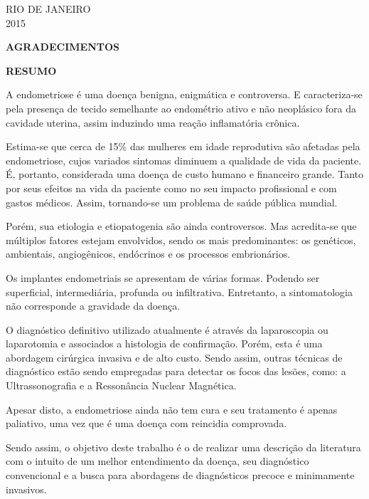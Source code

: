 \documentclass[12pt]{article} %
\begin{document}
\begin{center}
\MakeUppercase{Rio de Janeiro}\\
2015
\end{center}

\newpage

\begin{center}
\MakeUppercase{\textbf{Agradecimentos}}
\end{center}

\newpage
\begin{center}
\MakeUppercase{\textbf{Resumo}}
\end{center}

A endometriose é uma doença benigna, enigmática e controversa. E
caracteriza-se pela presença de tecido semelhante ao endométrio ativo
e não neoplásico fora da cavidade uterina, assim induzindo uma reação
inflamatória crônica.

Estima-se que cerca de 15\% das mulheres em idade reprodutiva são
afetadas pela endometriose, cujos variados sintomas diminuem a
qualidade de vida da paciente. É, portanto, considerada uma doença de
custo humano e financeiro grande.  Tanto por seus efeitos na vida da
paciente como no seu impacto profissional e com gastos médicos.
Assim, tornando-se um problema de saúde pública mundial.

Porém, sua etiologia e etiopatogenia são ainda controversos. Mas
acredita-se que múltiplos fatores estejam envolvidos, sendo os mais
predominantes: os genéticos, ambientais, angiogênicos, endócrinos e
os processos embrionários.

Os implantes endometriais se apresentam de várias formas. Podendo ser
superficial, intermediária, profunda ou infiltrativa. Entretanto, a
sintomatologia não corresponde a gravidade da doença. 

O diagnóstico definitivo utilizado atualmente é através da
laparoscopia ou laparotomia e associados a histologia de
confirmação. Porém, esta é uma abordagem cirúrgica invasiva e de alto
custo. Sendo assim, outras técnicas de diagnóstico estão sendo
empregadas para detectar os focos das lesões, como: a Ultrassonografia
e a Ressonância Nuclear Magnética.

Apesar disto, a endometriose ainda não tem cura e seu tratamento é
apenas paliativo, uma vez que é uma doença com reincidia comprovada.

Sendo assim, o objetivo deste trabalho é o de realizar uma descrição
da literatura com o intuito de um melhor entendimento da doença, seu
diagnóstico convencional e a busca para abordagens de diagnósticos
precoce e minimamente invasivos.
\end{document}
